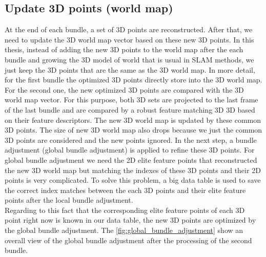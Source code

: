 \subsection{Update 3D points (world map)} \label{subsec:update_3d_points}
At the end of each bundle, a set of 3D points are reconstructed. After that, we need to update the 3D world map vector based on these new 3D points. In this thesis, instead of adding the new 3D points to the world map after the each bundle and growing the 3D model of world that is usual in SLAM methods, we just keep the 3D points that are the same as the 3D world map. In more detail, for the first bundle the optimized 3D points directly store into the 3D world map. For the second one, the new optimized 3D points are compared with the 3D world map vector. For this purpose, both 3D sets are projected to the last frame of the last bundle and are compared by a robust feature matching 3D 3D based on their feature descriptors. The new 3D world map is updated by these common 3D points. The size of new 3D world map also drops because we just the common 3D points are considered and the new points ignored.
In the next step, a bundle adjustment (global bundle adjustment) is applied to refine these 3D points. For global bundle adjustment we need the 2D elite feature points that reconstructed the new 3D world map but matching the indexes of these 3D points and their 2D points is very complicated. To solve this problem, a big data table is used to save the correct index matches between the each 3D points and their elite feature points after the local bundle adjustment.\\
Regarding to this fact that the corresponding elite feature points of each 3D point right now is known in our data table, the new 3D points are optimized by the global bundle adjustment. The \autoref{fig:global_bundle_adjustment} show an overall view of the global bundle adjustment after the processing of the second bundle.

